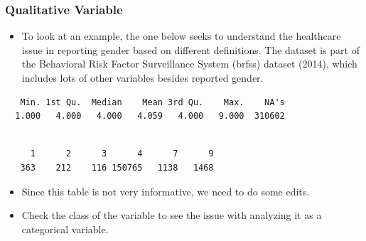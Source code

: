 \documentclass[
  letterpaper,
  DIV=11,
  numbers=noendperiod]{scrreprt}
\newenvironment{Shaded}{\begin{snugshade}}{\end{snugshade}}
\newcommand{\AttributeTok}[1]{\textcolor[rgb]{0.40,0.45,0.13}{#1}}
\newcommand{\CommentTok}[1]{\textcolor[rgb]{0.37,0.37,0.37}{#1}}
\newcommand{\FunctionTok}[1]{\textcolor[rgb]{0.28,0.35,0.67}{#1}}
\newcommand{\NormalTok}[1]{\textcolor[rgb]{0.00,0.23,0.31}{#1}}
\newcommand{\OtherTok}[1]{\textcolor[rgb]{0.00,0.23,0.31}{#1}}
\newcommand{\SpecialCharTok}[1]{\textcolor[rgb]{0.37,0.37,0.37}{#1}}
\newcommand{\StringTok}[1]{\textcolor[rgb]{0.13,0.47,0.30}{#1}}
\providecommand{\tightlist}{%
  \setlength{\itemsep}{0pt}\setlength{\parskip}{0pt}}\usepackage{longtable,booktabs,array}
\begin{document}
\subsubsection{Qualitative Variable}\label{qualitative-variable}

\begin{itemize}
\tightlist
\item
  To look at an example, the one below seeks to understand the
  healthcare issue in reporting gender based on different definitions.
  The dataset is part of the Behavioral Risk Factor Surveillance System
  (brfss) dataset (2014), which includes lots of other variables besides
  reported gender.
\end{itemize}

\begin{Shaded}
\end{Shaded}

\begin{verbatim}
   Min. 1st Qu.  Median    Mean 3rd Qu.    Max.    NA's 
  1.000   4.000   4.000   4.059   4.000   9.000  310602 
\end{verbatim}

\begin{Shaded}
\end{Shaded}

\begin{verbatim}

     1      2      3      4      7      9 
   363    212    116 150765   1138   1468 
\end{verbatim}

\begin{itemize}
\tightlist
\item
  Since this table is not very informative, we need to do some edits.
\item
  Check the class of the variable to see the issue with analyzing it as
  a categorical variable.
\end{itemize}
\end{document}

